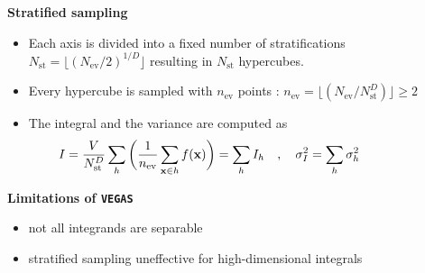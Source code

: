 \documentclass[t,handout,professionalfont,serif]{beamer}
\begin{document}
\begin{frame}
	\scriptsize
	\textbf{Stratified sampling}
	\begin{itemize}
		\item Each axis is divided into a fixed number of stratifications
		$N_\text{st} = \lfloor (N_\text{ev}/2)^{1/D}\rfloor $
		resulting in $N_\text{st}$ hypercubes.
		\item Every hypercube is sampled with $n_\text{ev}$ points : 	$n_\text{ev} = \lfloor (N_\text{ev}/N_\text{st}^D)\rfloor \ge 2$
		\item The integral and the variance are computed as
		\begin{equation*}
			\hspace{-2cm} I = \frac{V}{N_\text{st}^D}\sum_h \bigg(\frac{1}{n_\text{ev}} \sum_{\textbf{x} \in h} f(\textbf{x}) \bigg) = \sum_h I_h \quad , \quad \sigma^2_I = \sum_h \sigma^2_h 
		\end{equation*}
	\end{itemize}
	\vspace{0.5cm}
	\textbf{Limitations of \texttt{VEGAS}}
	\begin{itemize}
		\item not all integrands are separable
		\item stratified sampling uneffective for high-dimensional integrals
	\end{itemize}
\end{frame}
\end{document}
